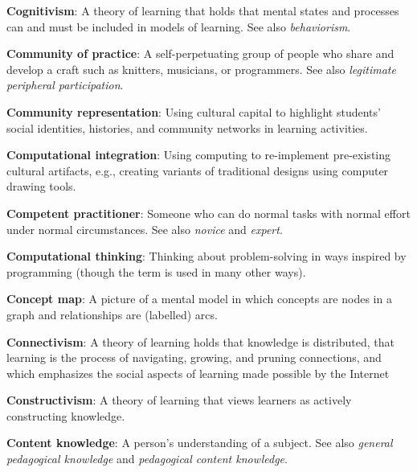 \textbf{\hypertarget{g:cognitivism}{Cognitivism}\label{g:cognitivism}}: A theory of learning that holds
that mental states and processes can and must be included in models of
learning. See also \emph{behaviorism}.

\textbf{\hypertarget{g:community-of-practice}{Community of practice}\label{g:community-of-practice}}: A
self-perpetuating group of people who share and develop a craft such as
knitters, musicians, or programmers. See also \emph{legitimate peripheral
participation}.

\textbf{\hypertarget{g:community-representation}{Community representation}\label{g:community-representation}}: Using
cultural capital to highlight students' social identities, histories,
and community networks in learning activities.

\textbf{\hypertarget{g:computational-integration}{Computational integration}\label{g:computational-integration}}:
Using computing to re-implement pre-existing cultural artifacts, e.g.,
creating variants of traditional designs using computer drawing tools.

\textbf{\hypertarget{g:competent-practitioner}{Competent practitioner}\label{g:competent-practitioner}}: Someone
who can do normal tasks with normal effort under normal circumstances.
See also \emph{novice} and \emph{expert}.

\textbf{\hypertarget{g:computational-thinking}{Computational thinking}\label{g:computational-thinking}}: Thinking
about problem-solving in ways inspired by programming (though the term
is used in many other ways).

\textbf{\hypertarget{g:concept-map}{Concept map}\label{g:concept-map}}: A picture of a mental model in
which concepts are nodes in a graph and relationships are (labelled)
arcs.

\textbf{\hypertarget{g:connectivism}{Connectivism}\label{g:connectivism}}: A theory of learning holds
that knowledge is distributed, that learning is the process of
navigating, growing, and pruning connections, and which emphasizes the
social aspects of learning made possible by the Internet

\textbf{\hypertarget{g:constructivism}{Constructivism}\label{g:constructivism}}: A theory of learning that
views learners as actively constructing knowledge.

\textbf{\hypertarget{g:content-knowledge}{Content knowledge}\label{g:content-knowledge}}: A person's
understanding of a subject. See also \emph{general pedagogical knowledge} and
\emph{pedagogical content knowledge}.

